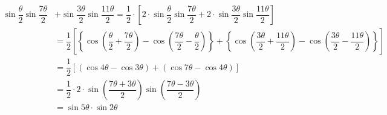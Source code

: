 \begin{solution}[\halfpage]
  \begin{fullwidth}
  \begin{align}
      \sin\dfrac{\theta}{2}\sin\dfrac{7\theta}{2} &+ \sin\dfrac{3\theta}{2}\sin\dfrac{11\theta}{2}
      = \dfrac{1}{2}\cdot\left[ 2\cdot\sin\dfrac{\theta}{2}\sin\dfrac{7\theta}{2} + 
         2\cdot\sin\dfrac{3\theta}{2}\sin\dfrac{11\theta}{2} \right] \\
       &= \dfrac{1}{2}\left[ \left\lbrace \cos\left( \dfrac{\theta}{2} + \dfrac{7\theta}{2}\right) 
           - \cos\left( \dfrac{7\theta}{2} - \dfrac{\theta}{2}\right)\right\rbrace
           + \left\lbrace \cos\left( \dfrac{3\theta}{2} + \dfrac{11\theta}{2}\right) 
           - \cos\left( \dfrac{3\theta}{2} - \dfrac{11\theta}{2}\right)\right\rbrace
           \right] \\
       &= \dfrac{1}{2}\left[ (\cos 4\theta - \cos 3\theta) + ( \cos 7\theta - \cos 4\theta)\right] \\
       &= \dfrac{1}{2}\cdot 2\cdot\sin\left( \dfrac{7\theta + 3\theta}{2}\right)\sin\left( \dfrac{7\theta - 3\theta}{2}\right) \\
       &= \sin 5\theta\cdot\sin 2\theta
  \end{align}
  \end{fullwidth}
\end{solution}
